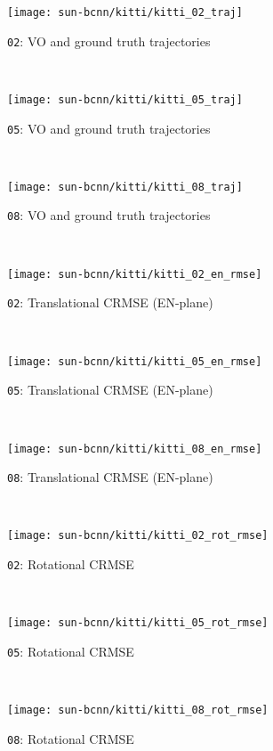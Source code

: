 \begin{figure*}
	\centering
	 \begin{subfigure}{0.3\textwidth}
    	\texttt{[image: sun-bcnn/kitti/kitti\_02\_traj]}
        \caption{\texttt{02}: VO and ground truth trajectories}
    \end{subfigure}
    ~
    \begin{subfigure}{0.3\textwidth}
    	\texttt{[image: sun-bcnn/kitti/kitti\_05\_traj]}
        \caption{\texttt{05}: VO and ground truth trajectories}
    \end{subfigure}
    ~
    \begin{subfigure}{0.3\textwidth}
    	\texttt{[image: sun-bcnn/kitti/kitti\_08\_traj]}
        \caption{\texttt{08}: VO and ground truth trajectories}
    \end{subfigure}
    \\
    \begin{subfigure}{0.3\textwidth}
    	\texttt{[image: sun-bcnn/kitti/kitti\_02\_en\_rmse]}
        \caption{\texttt{02}: Translational CRMSE (EN-plane)}
    \end{subfigure}
    ~
    \begin{subfigure}{0.3\textwidth}
    	\texttt{[image: sun-bcnn/kitti/kitti\_05\_en\_rmse]}
        \caption{\texttt{05}: Translational CRMSE (EN-plane)}
    \end{subfigure}
    ~
    \begin{subfigure}{0.3\textwidth}
    	\texttt{[image: sun-bcnn/kitti/kitti\_08\_en\_rmse]}
        \caption{\texttt{08}: Translational CRMSE (EN-plane)}
    \end{subfigure}
    \\
    \begin{subfigure}{0.3\textwidth}
    	\texttt{[image: sun-bcnn/kitti/kitti\_02\_rot\_rmse]}
        \caption{\texttt{02}: Rotational CRMSE}
    \end{subfigure}
    ~
    \begin{subfigure}{0.3\textwidth}
    	\texttt{[image: sun-bcnn/kitti/kitti\_05\_rot\_rmse]}
        \caption{\texttt{05}: Rotational CRMSE}
    \end{subfigure}
    ~
    \begin{subfigure}{0.3\textwidth}
    	\texttt{[image: sun-bcnn/kitti/kitti\_08\_rot\_rmse]}
        \caption{\texttt{08}: Rotational CRMSE}
    \end{subfigure}
    

\end{figure*}
